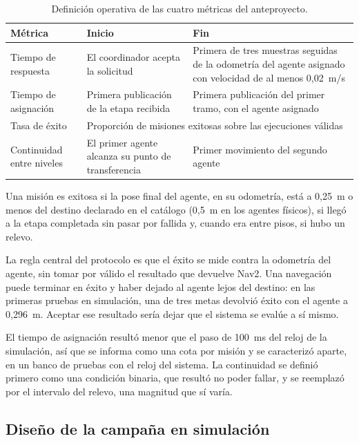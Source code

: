 \begin{table}[htbp]
  \centering\small
  \caption{Definición operativa de las cuatro métricas del anteproyecto.}
  \label{tab:metricas}
  \begin{tabular}{@{}p{}p{}p{}@{}}
    \toprule
    \textbf{Métrica} & \textbf{Inicio} & \textbf{Fin} \\ \midrule
    Tiempo de respuesta & El coordinador acepta la solicitud & Primera de tres muestras seguidas de la odometría del agente asignado con velocidad de al menos 0,02~m/s \\ \addlinespace
    Tiempo de asignación & Primera publicación de la etapa recibida & Primera publicación del primer tramo, con el agente asignado \\ \addlinespace
    Tasa de éxito & \multicolumn{2}{p{0.72\textwidth}}{Proporción de misiones exitosas sobre las ejecuciones válidas} \\ \addlinespace
    Continuidad entre niveles & El primer agente alcanza su punto de transferencia & Primer movimiento del segundo agente \\ \bottomrule
  \end{tabular}
\end{table}

Una misión es exitosa si la pose final del agente, en su odometría, está a 0,25~m o menos del destino declarado en el catálogo (0,5~m en los agentes físicos), si llegó a la etapa completada sin pasar por fallida y, cuando era entre
pisos, si hubo un relevo.

La regla central del protocolo es que el éxito se mide contra la odometría del agente, sin tomar por válido el resultado que devuelve Nav2. Una navegación puede terminar en éxito y haber dejado al agente lejos del destino: en las
primeras pruebas en simulación, una de tres metas devolvió éxito con el agente a 0,296~m. Aceptar ese resultado sería dejar que el sistema se evalúe a sí mismo.

El tiempo de asignación resultó menor que el paso de 100~ms del reloj de la simulación, así que se informa como una cota por misión y se caracterizó aparte, en un banco de pruebas con el reloj del sistema. La continuidad se definió
primero como una condición binaria, que resultó no poder fallar, y se reemplazó por el intervalo del relevo, una magnitud que sí varía.

\subsection{Diseño de la campaña en simulación}

